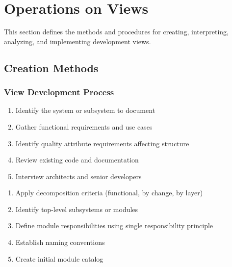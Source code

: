 \documentclass[11pt,letterpaper]{article}
\begin{document}
\section{Operations on Views}

This section defines the methods and procedures for creating, interpreting, analyzing, and implementing development views.

\subsection{Creation Methods}

\subsubsection{View Development Process}

\begin{guidancebox}
\begin{enumerate}[nosep]
    \item Identify the system or subsystem to document
    \item Gather functional requirements and use cases
    \item Identify quality attribute requirements affecting structure
    \item Review existing code and documentation
    \item Interview architects and senior developers
\end{enumerate}
\end{guidancebox}

\begin{guidancebox}
\begin{enumerate}[nosep]
    \item Apply decomposition criteria (functional, by change, by layer)
    \item Identify top-level subsystems or modules
    \item Define module responsibilities using single responsibility principle
    \item Establish naming conventions
    \item Create initial module catalog
\end{enumerate}
\end{guidancebox}
\end{document}
